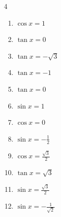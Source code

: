 \begin{multicols}{4}
\begin{enumerate}
  \item $\displaystyle \cos{x}  = 1$

        \phantom{$\displaystyle x = 0$}

  \item $\displaystyle \tan{x}  = 0$

        \phantom{$\displaystyle x = 0 , \pi$}

  \item $\displaystyle \tan{x}  = -\sqrt{3}$


  \item $\displaystyle \tan{x}  = -1$


  \item $\displaystyle \tan{x}  = 0$

        \phantom{$\displaystyle x = 0 , \pi$}

\columnbreak %

  \item $\displaystyle \sin{x}  = 1$


  \item $\displaystyle \cos{x}  = 0$


  \item $\displaystyle \sin{x}  = -\frac{1}{2}$


  \item $\displaystyle \cos{x}  = \frac{\sqrt{3}}{2}$


  \item $\displaystyle \tan{x}  = \sqrt{3}$


  \item $\displaystyle \sin{x}  = \frac{\sqrt{3}}{2}$


  \item $\displaystyle \sin{x}  = -\frac{1}{\sqrt{2}}$


\end{enumerate}
\end{multicols}
